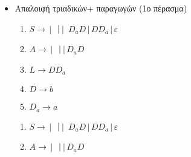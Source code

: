 \begin{tcolorbox}[colback=yellow!15!white, colframe=blue!50!white,
	fonttitle=\bfseries\Large, title = Μετατροπή $CFG\rightarrow CNF$ 2/3]
\begin{itemize}
\begin{minipage}[t]{0.5\textwidth}
\begin{enumerate}
				\textcolor{violet}{}
				\reducevspace
				\item $L\rightarrow D$\textcolor{violet}{}
				\reducevspace
				\item $D\rightarrow b$
				\reducevspace
				\item \textcolor{blue}{}\textcolor{teal}{}
			\end{enumerate}
		\end{minipage}

		\bigskip \smallskip
		\item Απαλοιφή τριαδικών+ παραγωγών (1ο πέρασμα)
		\reducevspace\reducevspace\reducevspace\reducevspace\reducevspace\reducevspace\reducevspace\reducevspace

		\begin{minipage}[t]{0.5\textwidth}
			\begin{enumerate}
				\item $S\rightarrow$\textcolor{purple}{}$\,|\,$
				\textcolor{purple}{}$\,|\\$\textcolor{purple}{}$\,|\,$
				$D_aD\,|\,DD_a\,|\, \varepsilon$
				\reducevspace
				\item $A\rightarrow$\textcolor{purple}{}$\,|\,$
				\textcolor{purple}{}$\,|\\$\textcolor{purple}{}$\,|\,D_aD$
				\reducevspace
				\item $L\rightarrow DD_a$
				\reducevspace
				\item $D\rightarrow b$
				\reducevspace
				\item $D_a\rightarrow a$
			\end{enumerate}
		\end{minipage}%
		\hfill
		\begin{minipage}[t]{0.5\textwidth}
			\begin{enumerate}
				\item $S\rightarrow$\textcolor{violet}{}$\,|\,$
				\textcolor{violet}{}$\,|\\$\textcolor{violet}{}$\,|\,$
				$D_aD\,|\,DD_a\,|\, \varepsilon$
				\reducevspace
				\item $A\rightarrow$\textcolor{violet}{}$\,|\,$
				\textcolor{violet}{}$\,|\\$\textcolor{violet}{}$\,|\,D_aD$

\end{enumerate}
\end{minipage}
\end{itemize}
\end{tcolorbox}
